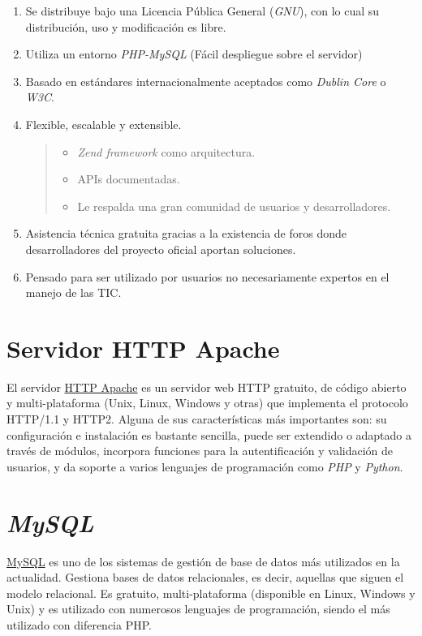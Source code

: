 \begin{enumerate}
\def\labelenumi{\arabic{enumi}.}
\tightlist
\item
  Se distribuye bajo una Licencia Pública General (\emph{GNU}), con lo cual su
  distribución, uso y modificación es libre.
\item
  Utiliza un entorno \emph{PHP-MySQL} (Fácil despliegue sobre el servidor)
\item
  Basado en estándares internacionalmente aceptados como \emph{Dublin
  Core} o \emph{W3C}.
\item
  Flexible, escalable y extensible.

  \begin{quote}
  \begin{itemize}
  \tightlist
  \item
    \emph{Zend framework} como arquitectura.
  \item
    APIs documentadas.
  \item
    Le respalda una gran comunidad de usuarios y desarrolladores.
  \end{itemize}
  \end{quote}
\item
  Asistencia técnica gratuita gracias a la existencia de foros donde
  desarrolladores del proyecto oficial aportan soluciones.
\item
  Pensado para ser utilizado por usuarios no necesariamente expertos en
  el manejo de las TIC.
\end{enumerate}

\section{Servidor HTTP Apache}

El servidor \href{https://httpd.apache.org/}{HTTP Apache} es un servidor
web HTTP gratuito, de código abierto y multi-plataforma (Unix, Linux,
Windows y otras) que implementa el protocolo HTTP/1.1 y HTTP2. Alguna de
sus características más importantes son: su configuración e instalación
es bastante sencilla, puede ser extendido o adaptado a través de
módulos, incorpora funciones para la autentificación y validación de
usuarios, y da soporte a varios lenguajes de programación como \emph{PHP} y
\emph{Python}.

\section{\emph{MySQL}}

\href{https://www.mysql.com/}{MySQL} es uno de los sistemas de gestión
de base de datos más utilizados en la actualidad. Gestiona bases de
datos relacionales, es decir, aquellas que siguen el modelo relacional.
Es gratuito, multi-plataforma (disponible en Linux, Windows y Unix) y es
utilizado con numerosos lenguajes de programación, siendo el más
utilizado con diferencia PHP.

